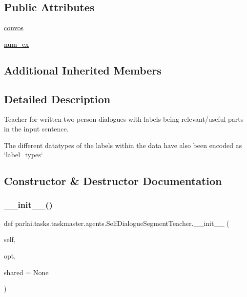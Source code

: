 \subsection*{Public Attributes}
\begin{DoxyCompactItemize}
\item 
\hyperlink{classparlai_1_1tasks_1_1taskmaster_1_1agents_1_1SelfDialogueSegmentTeacher_aced6b44c6ab5da0943ebd6f16acc5339}{convos}
\item 
\hyperlink{classparlai_1_1tasks_1_1taskmaster_1_1agents_1_1SelfDialogueSegmentTeacher_a231381551fe76fdbf333c0fd8c671b5e}{num\+\_\+ex}
\end{DoxyCompactItemize}
\subsection*{Additional Inherited Members}


\subsection{Detailed Description}
\begin{DoxyVerb}Teacher for written two-person dialogues with labels being relevant/useful parts in
the input sentence.

The different datatypes of the labels within the data have also been encoded as
`label_types`
\end{DoxyVerb}
 

\subsection{Constructor \& Destructor Documentation}
\mbox{\label{classparlai_1_1tasks_1_1taskmaster_1_1agents_1_1SelfDialogueSegmentTeacher_a508d7db21bcb258cbeb1d89c5f33d6a3}} 
\subsubsection{\texorpdfstring{\+\_\+\+\_\+init\+\_\+\+\_\+()}{\_\_init\_\_()}}
{\footnotesize\ttfamily def parlai.\+tasks.\+taskmaster.\+agents.\+Self\+Dialogue\+Segment\+Teacher.\+\_\+\+\_\+init\+\_\+\+\_\+ (\begin{DoxyParamCaption}\item[{}]{self,  }\item[{}]{opt,  }\item[{}]{shared = {\ttfamily None} }\end{DoxyParamCaption})}



